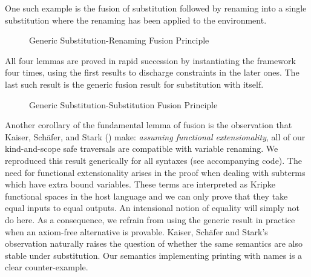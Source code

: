One such example is the fusion of substitution followed by renaming into a
single substitution where the renaming has been applied to the environment.

\begin{figure}[h]
\caption{Generic Substitution-Renaming Fusion Principle\label{defn:SubRen-Fusion}}
\end{figure}

All four lemmas are proved in rapid succession by instantiating the 
framework four times, using the first results to discharge constraints in the
later ones. The last such result is the generic fusion result for substitution
with itself.

\begin{figure}[h]
\caption{Generic Substitution-Substitution Fusion Principle}
\end{figure}

Another corollary of the fundamental lemma of fusion is the observation that
Kaiser, Schäfer, and Stark (\citeyear{Kaiser-wsdebr}) make: \emph{assuming
functional extensionality}, all of our kind-and-scope safe traversals are
compatible with variable renaming.
%
We reproduced this result generically for all syntaxes (see accompanying code).
The need for functional extensionality arises in the proof when dealing with
subterms which have extra bound variables. These terms are interpreted as
Kripke functional spaces in the host language and we can only prove that they
take equal inputs to equal outputs. An intensional notion of equality will
simply not do here.
%
As a consequence, we refrain from using the generic result in practice when
an axiom-free alternative is provable. Kaiser, Schäfer and Stark's observation
naturally raises the question of whether the same semantics are also stable
under substitution. Our semantics implementing printing with names is a clear
counter-example.
